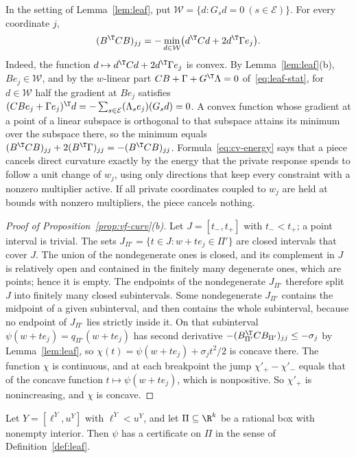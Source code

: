 In the setting of Lemma~\ref{lem:leaf}, put
$\mathcal W=\{d:G_sd=0\ (s\in\mathcal E)\}$. For every coordinate $j$,
\begin{equation}\label{eq:cv-energy}
(B^{\T}CB)_{jj}
=-\min_{d\in\mathcal W}\bigl(d^{\T}Cd+2d^{\T}\Gamma e_j\bigr).
\end{equation}
Indeed, the function $d\mapsto d^{\T}Cd+2d^{\T}\Gamma e_j$ is convex. By
Lemma~\ref{lem:leaf}(b), $Be_j\in\mathcal W$, and by the $w$-linear part
$CB+\Gamma+G^{\T}\Lambda=0$ of~\eqref{eq:leaf-stat}, for $d\in\mathcal W$
half the gradient at $Be_j$ satisfies
$(CBe_j+\Gamma e_j)^{\T}d=-\sum_{s\in\mathcal E}(\Lambda_se_j)(G_sd)=0$. A
convex function whose gradient at a point of a linear subspace is orthogonal
to that subspace attains its minimum over the subspace there, so the minimum
equals $(B^{\T}CB)_{jj}+2(B^{\T}\Gamma)_{jj}=-(B^{\T}CB)_{jj}$.
Formula~\eqref{eq:cv-energy} says that a piece cancels direct curvature
exactly by the energy that the private response spends to follow a unit
change of $w_j$, using only directions that keep every constraint with a
nonzero multiplier active. If all private coordinates coupled to $w_j$ are
held at bounds with nonzero multipliers, the piece cancels nothing.


\begin{proof}[Proof of Proposition~\ref{prop:vf-curv}(b)]
Let $J=[t_-,t_+]$ with $t_-<t_+$; a point interval is trivial. The sets
$J_{\Pi'}=\{t\in J:w+te_j\in\Pi'\}$ are closed intervals that cover $J$. The
union of the nondegenerate ones is closed, and its complement in $J$ is
relatively open and contained in the finitely many degenerate ones, which
are points; hence it is empty. The endpoints of the nondegenerate
$J_{\Pi'}$ therefore split $J$ into finitely many closed subintervals. Some
nondegenerate $J_{\Pi'}$ contains the midpoint of a given subinterval, and
then contains the whole subinterval, because no endpoint of $J_{\Pi'}$ lies
strictly inside it. On that subinterval $\psi(w+te_j)=q_{\Pi'}(w+te_j)$ has
second derivative $-(B_{\Pi'}^{\T}CB_{\Pi'})_{jj}\le-\sigma_j$ by
Lemma~\ref{lem:leaf}, so $\chi(t)=\psi(w+te_j)+\sigma_jt^2/2$ is concave
there. The function $\chi$ is continuous, and at each breakpoint the jump
$\chi'_+-\chi'_-$ equals that of the concave function $t\mapsto\psi(w+te_j)$,
which is nonpositive. So $\chi'_+$ is nonincreasing, and $\chi$ is concave.
\end{proof}

\begin{proposition}\label{prop:cert-exist}
Let $Y=[\ell^Y,u^Y]$ with $\ell^Y<u^Y$, and let $\Pi\subseteq\R^k$ be a
rational box with nonempty interior. Then $\psi$ has a certificate on $\Pi$
in the sense of Definition~\ref{def:leaf}.
\end{proposition}

